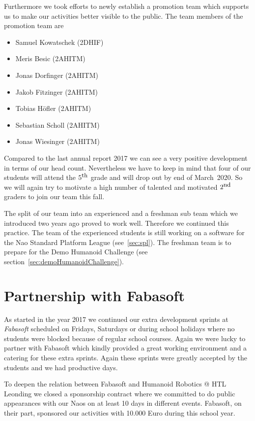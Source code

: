 \documentclass[11pt]{article}
\begin{document}
Furthermore we took efforts to newly establish a promotion team which supports us to make our activities better visible to the public. The team members of the promotion team are

\begin{multicols}{2}
\begin{itemize}
	\item Samuel Kowatschek (2DHIF)
	\item Meris Besic (2AHITM)
	\item Jonas Dorfinger (2AHITM)
	\item Jakob Fitzinger (2AHITM)
	\item Tobias Höfler (2AHITM)
	\item Sebastian Scholl (2AHITM)
	\item Jonas Wiesinger (2AHITM)
\end{itemize}
\end{multicols}

Compared to the last annual report 2017 we can see a very positive development in terms of our head count. Nevertheless we have to keep in mind that four of our students will attend the $5^{\textrm{\small th}}$ grade and will drop out by end of March~2020. So we will again try to motivate a high number of talented and motivated $2^{\textrm{\small nd}}$ graders to join our team this fall.

The split of our team into an experienced and a freshman sub team which we introduced two years ago proved to work well. Therefore we continued this practice. The team of the experienced students is still  working on a software for the Nao Standard Platform League (see~\ref{sec:spl}). The freshman team is to prepare for the Demo Humanoid Challenge (see section~\ref{sec:demoHumanoidChallenge}).

\section{Partnership with Fabasoft}
As started in the year 2017 we continued our extra development sprints at {\em Fabasoft} scheduled on Fridays, Saturdays or during school holidays where no students were blocked because of regular school courses. Again we were lucky to partner with Fabasoft which kindly provided a great working environment and a catering for these extra sprints. Again these sprints were greatly accepted by the students and we had productive days.

To deepen the relation between Fabasoft and Humanoid Robotics @ HTL Leonding we closed a sponsorship contract where we committed to do public appearances with our Naos on at least 10 days in different events. Fabasoft, on their part, sponsored our activities with 10.000 Euro during this school year.
\end{document}
